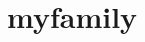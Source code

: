 \chapter{myfamily}
\hypertarget{md__r_e_a_d_m_e}{}\label{md__r_e_a_d_m_e}
\label{md__r_e_a_d_m_e_autotoc_md0}%
%
